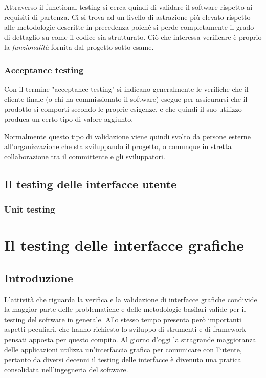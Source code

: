 \documentclass[12pt]{toptesi}
\begin{document}
Attraverso il functional testing si cerca quindi di validare il software rispetto ai requisiti di partenza. Ci si trova ad un livello di astrazione più elevato rispetto alle metodologie descritte in precedenza poiché si perde completamente il grado di dettaglio su come il codice sia strutturato. Ciò che interessa verificare è proprio la \emph{funzionalità} fornita dal progetto sotto esame.

\subsection{Acceptance testing}

Con il termine "acceptance testing" si indicano generalmente le verifiche che il cliente finale (o chi ha commissionato il software) esegue per assicurarsi che il prodotto si comporti secondo le proprie esigenze, e che quindi il suo
utilizzo produca un certo tipo di valore aggiunto.

Normalmente questo tipo di validazione viene quindi svolto da persone esterne all'organizzazione che sta sviluppando il progetto, o comunque in stretta collaborazione tra il committente e gli sviluppatori. 

\section{Il testing delle interfacce utente}

\subsection{Unit testing}


\chapter{Il testing delle interfacce grafiche}

\section{Introduzione}

L'attività che riguarda la verifica e la validazione di interfacce grafiche condivide la maggior parte delle problematiche e delle metodologie basilari valide per il testing del software in generale.
Allo stesso tempo presenta però importanti aspetti peculiari, che hanno richiesto lo sviluppo di strumenti e di framework pensati apposta per questo compito. Al giorno d'oggi la stragrande maggioranza delle applicazioni utilizza un'interfaccia grafica per comunicare con l'utente, pertanto da diversi decenni il testing delle interfacce è divenuto una pratica consolidata nell'ingegneria del software.
\end{document}
